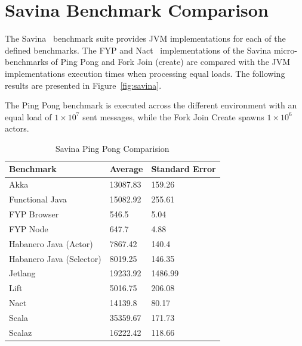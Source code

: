 \documentclass[oneside]{um-fict}
\begin{document}
\section{Savina Benchmark Comparison}
The Savina~\cite{savina} benchmark suite provides JVM implementations for each of the defined benchmarks. The FYP and Nact~\cite{nact} implementations of the Savina micro-benchmarks of Ping Pong and Fork Join (create) are compared with the JVM implementations execution times when processing equal loads. The following results are presented in Figure~\ref{fig:savina}.

The Ping Pong benchmark is executed across the different environment with an equal load of $1\times10^7$ sent messages, while the Fork Join Create spawns $1\times10^6$ actors.
\begin{table}[H]
    \begin{center}
        \begin{tabular}{|l|ll|}
        \hline
        Benchmark                & Average  & Standard Error \\ \hline
        Akka                     & 13087.83 & 159.26         \\
        Functional Java          & 15082.92 & 255.61         \\
        FYP Browser              & 546.5    & 5.04           \\
        FYP Node                 & 647.7    & 4.88           \\
        Habanero Java (Actor)    & 7867.42  & 140.4          \\
        Habanero Java (Selector) & 8019.25  & 146.35         \\
        Jetlang                  & 19233.92 & 1486.99        \\
        Lift                     & 5016.75  & 206.08         \\
        Nact                     & 14139.8  & 80.17          \\
        Scala                    & 35359.67 & 171.73         \\
        Scalaz                   & 16222.42 & 118.66         \\ \hline
        \end{tabular}
        \caption{Savina Ping Pong Comparision}\label{tab:savinapingpong}
    \end{center}
\end{table}
\end{document}
